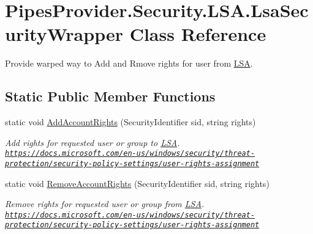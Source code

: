 \hypertarget{class_pipes_provider_1_1_security_1_1_l_s_a_1_1_lsa_security_wrapper}{}\section{Pipes\+Provider.\+Security.\+L\+S\+A.\+Lsa\+Security\+Wrapper Class Reference}
\label{class_pipes_provider_1_1_security_1_1_l_s_a_1_1_lsa_security_wrapper}


Provide warped way to Add and Rmove rights for user from \mbox{\hyperlink{namespace_pipes_provider_1_1_security_1_1_l_s_a}{L\+SA}}.  


\subsection*{Static Public Member Functions}
\begin{DoxyCompactItemize}
\item 
static void \mbox{\hyperlink{class_pipes_provider_1_1_security_1_1_l_s_a_1_1_lsa_security_wrapper_adac61a41a0472231a990f1274834ee4d}{Add\+Account\+Rights}} (Security\+Identifier sid, string rights)
\begin{DoxyCompactList}\small\item\em Add rights for requested user or group to \mbox{\hyperlink{namespace_pipes_provider_1_1_security_1_1_l_s_a}{L\+SA}}. \href{https://docs.microsoft.com/en-us/windows/security/threat-protection/security-policy-settings/user-rights-assignment}{\tt https\+://docs.\+microsoft.\+com/en-\/us/windows/security/threat-\/protection/security-\/policy-\/settings/user-\/rights-\/assignment} \end{DoxyCompactList}\item 
static void \mbox{\hyperlink{class_pipes_provider_1_1_security_1_1_l_s_a_1_1_lsa_security_wrapper_ad14aaa2cffa5be534590d0ef30810117}{Remove\+Account\+Rights}} (Security\+Identifier sid, string rights)
\begin{DoxyCompactList}\small\item\em Remove rights for requested user or group from \mbox{\hyperlink{namespace_pipes_provider_1_1_security_1_1_l_s_a}{L\+SA}}. \href{https://docs.microsoft.com/en-us/windows/security/threat-protection/security-policy-settings/user-rights-assignment}{\tt https\+://docs.\+microsoft.\+com/en-\/us/windows/security/threat-\/protection/security-\/policy-\/settings/user-\/rights-\/assignment} \end{DoxyCompactList}\end{DoxyCompactItemize}
